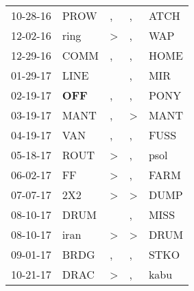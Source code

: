 \begin{supertabular}{p{0.07\textwidth}p{0.06\textwidth}p{0.02\textwidth}p{0.02\textwidth}p{0.06\textwidth}}
          10-28-16\textsuperscript{} &           PROW\textsuperscript{} &                , &                , &           ATCH\textsuperscript{} \\
          12-02-16\textsuperscript{} &           ring\textsuperscript{} &     \textgreater &                , &            WAP\textsuperscript{} \\
          12-29-16\textsuperscript{} &           COMM\textsuperscript{} &                , &                , &           HOME\textsuperscript{} \\
          01-29-17\textsuperscript{} &           LINE\textsuperscript{} &                  &                , &            MIR\textsuperscript{} \\
          02-19-17\textsuperscript{} &   \textbf{OFF\textsuperscript{}} &                , &                , &           PONY\textsuperscript{} \\
          03-19-17\textsuperscript{} &           MANT\textsuperscript{} &                , &     \textgreater &           MANT\textsuperscript{} \\
          04-19-17\textsuperscript{} &            VAN\textsuperscript{} &                , &                , &           FUSS\textsuperscript{} \\
          05-18-17\textsuperscript{} &           ROUT\textsuperscript{} &     \textgreater &                , &           psol\textsuperscript{} \\
          06-02-17\textsuperscript{} &             FF\textsuperscript{} &     \textgreater &                , &           FARM\textsuperscript{} \\
          07-07-17\textsuperscript{} &            2X2\textsuperscript{} &     \textgreater &     \textgreater &           DUMP\textsuperscript{} \\
          08-10-17\textsuperscript{} &           DRUM\textsuperscript{} &                  &                , &           MISS\textsuperscript{} \\
          08-10-17\textsuperscript{} &           iran\textsuperscript{} &     \textgreater &     \textgreater &           DRUM\textsuperscript{} \\
          09-01-17\textsuperscript{} &           BRDG\textsuperscript{} &                , &                , &           STKO\textsuperscript{} \\
          10-21-17\textsuperscript{} &           DRAC\textsuperscript{} &     \textgreater &                , &           kabu\textsuperscript{} \\

\end{supertabular}
